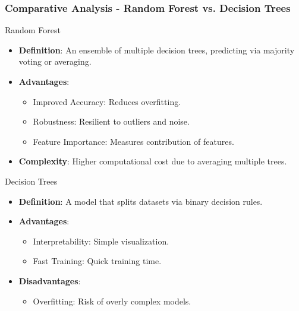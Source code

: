 \documentclass[aspectratio=169]{beamer}
\begin{document}
\begin{frame}[fragile]
    \frametitle{Comparative Analysis - Random Forest vs. Decision Trees}
    \begin{block}{Random Forest}
        \begin{itemize}
            \item \textbf{Definition}: An ensemble of multiple decision trees, predicting via majority voting or averaging.
            \item \textbf{Advantages}:
                \begin{itemize}
                    \item Improved Accuracy: Reduces overfitting.
                    \item Robustness: Resilient to outliers and noise.
                    \item Feature Importance: Measures contribution of features.
                \end{itemize}
            \item \textbf{Complexity}: Higher computational cost due to averaging multiple trees.
        \end{itemize}
    \end{block}

    \begin{block}{Decision Trees}
        \begin{itemize}
            \item \textbf{Definition}: A model that splits datasets via binary decision rules.
            \item \textbf{Advantages}:
                \begin{itemize}
                    \item Interpretability: Simple visualization.
                    \item Fast Training: Quick training time.
                \end{itemize}
            \item \textbf{Disadvantages}:
                \begin{itemize}
                    \item Overfitting: Risk of overly complex models.
                \end{itemize}
        \end{itemize}
    \end{block}
\end{frame}
\end{document}
